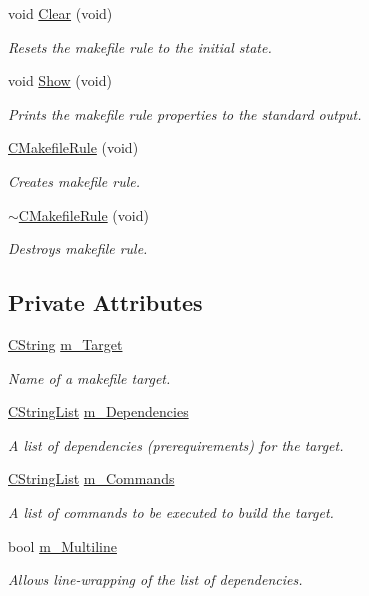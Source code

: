 \begin{DoxyCompactItemize}
void \hyperlink{classCMakefileRule_ae4d474fd54ac9c902c31ddb2aebf721e}{Clear} (void)
\begin{DoxyCompactList}\small\item\em Resets the makefile rule to the initial state. \end{DoxyCompactList}\item 
void \hyperlink{classCMakefileRule_afb306c6ae36395c3552e76e341567646}{Show} (void)
\begin{DoxyCompactList}\small\item\em Prints the makefile rule properties to the standard output. \end{DoxyCompactList}\item 
\hyperlink{classCMakefileRule_a443464a547ab7f3f5a2c5df8cd0ac466}{C\-Makefile\-Rule} (void)
\begin{DoxyCompactList}\small\item\em Creates makefile rule. \end{DoxyCompactList}\item 
\hyperlink{classCMakefileRule_af2285fe40026ea3874e2cb02a651b097}{$\sim$\-C\-Makefile\-Rule} (void)
\begin{DoxyCompactList}\small\item\em Destroys makefile rule. \end{DoxyCompactList}\end{DoxyCompactItemize}
\subsection*{Private Attributes}
\begin{DoxyCompactItemize}
\item 
\hyperlink{classCString}{C\-String} \hyperlink{classCMakefileRule_ad951eb8f2f582b95e8fff72d77296233}{m\-\_\-\-Target}
\begin{DoxyCompactList}\small\item\em Name of a makefile target. \end{DoxyCompactList}\item 
\hyperlink{classCStringList}{C\-String\-List} \hyperlink{classCMakefileRule_a8c5b1f8e55ba7d7421feb84a02a96e75}{m\-\_\-\-Dependencies}
\begin{DoxyCompactList}\small\item\em A list of dependencies (prerequirements) for the target. \end{DoxyCompactList}\item 
\hyperlink{classCStringList}{C\-String\-List} \hyperlink{classCMakefileRule_a99fec9b4ba99c02b59c71b6fff71e863}{m\-\_\-\-Commands}
\begin{DoxyCompactList}\small\item\em A list of commands to be executed to build the target. \end{DoxyCompactList}\item 
bool \hyperlink{classCMakefileRule_a9a2e0ba695a307f15e2f3329b3b198c4}{m\-\_\-\-Multiline}
\begin{DoxyCompactList}\small\item\em Allows line-\/wrapping of the list of dependencies. \end{DoxyCompactList}\end{DoxyCompactItemize}


